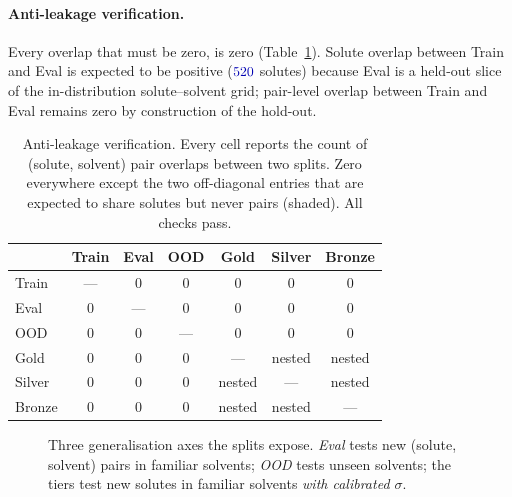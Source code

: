 \paragraph{Anti-leakage verification.}
Every overlap that must be zero, is zero (Table~\ref{tab:antileakage}).
Solute overlap between Train and Eval is expected to be positive
($\numval{520}$ solutes) because Eval is a held-out slice of the
in-distribution solute--solvent grid; pair-level overlap between Train
and Eval remains zero by construction of the hold-out.

\begin{table}[h]
\centering\small
\caption{Anti-leakage verification.  Every cell reports the count of
(solute, solvent) pair overlaps between two splits.  Zero everywhere
except the two off-diagonal entries that are expected to share solutes
but never pairs (shaded).  All checks pass.}
\label{tab:antileakage}
\begin{tabular}{@{}lcccccc@{}}
\toprule
          & Train & Eval & OOD & Gold & Silver & Bronze \\
\midrule
Train     & ---   & 0    & 0   & 0    & 0      & 0      \\
Eval      & 0     & ---  & 0   & 0    & 0      & 0      \\
OOD       & 0     & 0    & --- & 0    & 0      & 0      \\
Gold      & 0     & 0    & 0   & ---  & nested & nested \\
Silver    & 0     & 0    & 0   & nested & ---  & nested \\
Bronze    & 0     & 0    & 0   & nested & nested & ---   \\
\bottomrule
\end{tabular}
\end{table}

\begin{figure}[h]
\centering
{}
\caption{Three generalisation axes the splits expose.  \emph{Eval}
tests new (solute, solvent) pairs in familiar solvents;
\emph{OOD} tests unseen solvents; the tiers test new solutes in
familiar solvents \emph{with calibrated $\sigma$}.}
\label{fig:splits_diagram}
\end{figure}
